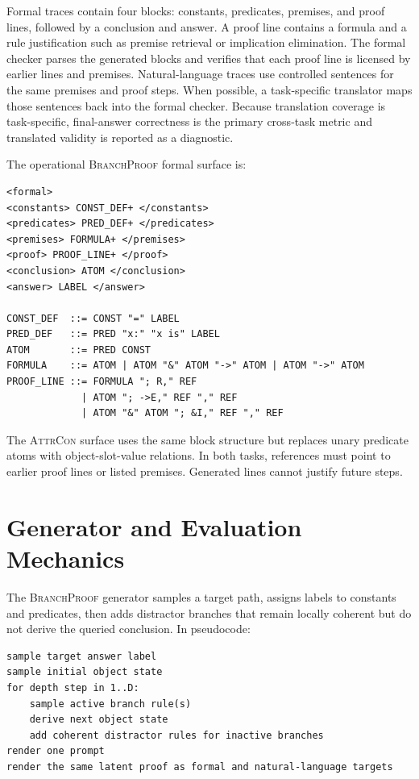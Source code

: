 \documentclass[11pt]{article}
\newcommand{\branchproof}{\textsc{BranchProof}}
\newcommand{\attrcon}{\textsc{AttrCon}}
\begin{document}
Formal traces contain four blocks: constants, predicates, premises, and proof
lines, followed by a conclusion and answer. A proof line contains a formula and
a rule justification such as premise retrieval or implication elimination. The
formal checker parses the generated blocks and verifies that each proof line is
licensed by earlier lines and premises. Natural-language traces use controlled
sentences for the same premises and proof steps. When possible, a
task-specific translator maps those sentences back into the formal checker.
Because translation coverage is task-specific, final-answer correctness is the
primary cross-task metric and translated validity is reported as a diagnostic.

The operational \branchproof{} formal surface is:

\begin{verbatim}
<formal>
<constants> CONST_DEF+ </constants>
<predicates> PRED_DEF+ </predicates>
<premises> FORMULA+ </premises>
<proof> PROOF_LINE+ </proof>
<conclusion> ATOM </conclusion>
<answer> LABEL </answer>

CONST_DEF  ::= CONST "=" LABEL
PRED_DEF   ::= PRED "x:" "x is" LABEL
ATOM       ::= PRED CONST
FORMULA    ::= ATOM | ATOM "&" ATOM "->" ATOM | ATOM "->" ATOM
PROOF_LINE ::= FORMULA "; R," REF
             | ATOM "; ->E," REF "," REF
             | ATOM "&" ATOM "; &I," REF "," REF
\end{verbatim}

The \attrcon{} surface uses the same block structure but replaces unary
predicate atoms with object-slot-value relations. In both tasks, references
must point to earlier proof lines or listed premises. Generated lines cannot
justify future steps.

\section{Generator and Evaluation Mechanics}
\label{sec:generator-eval}

The \branchproof{} generator samples a target path, assigns labels to constants
and predicates, then adds distractor branches that remain locally coherent but
do not derive the queried conclusion. In pseudocode:

\begin{verbatim}
sample target answer label
sample initial object state
for depth step in 1..D:
    sample active branch rule(s)
    derive next object state
    add coherent distractor rules for inactive branches
render one prompt
render the same latent proof as formal and natural-language targets
\end{verbatim}
\end{document}
